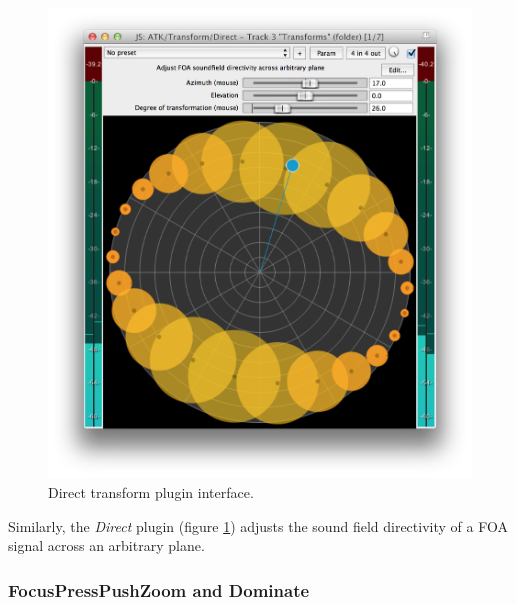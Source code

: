 \documentclass{article}
\begin{document}
\begin{figure}[h]
\captionsetup{aboveskip=-6pt}
\centering
\includegraphics[width=0.9\columnwidth]{figures/directTransform.png}
\caption{Direct transform plugin interface.\label{fig:directTransform}}
\end{figure}

Similarly, the \emph{Direct} plugin (figure \ref{fig:directTransform}) adjusts the sound field directivity of a FOA signal across an arbitrary plane.


 
\subsubsection{FocusPressPushZoom and Dominate}\label{sec:focus}
\end{document}
